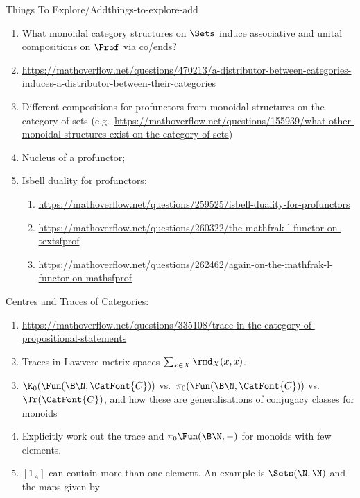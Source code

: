 \begin{remark}{Things To Explore/Add}{things-to-explore-add}
\begin{enumerate}
            However, if $\CatFont{V}$ is $*$-autonomous, then $\mathsf{Prof}_{\CatFont{V}}$ is a linear bicategory (Proposition 6.6 of \url{https://arxiv.org/abs/2209.05693}). In that case, there's probably a calculus of left/right Kan extensions/lifts one can develop. What is it?
        \item What monoidal category structures on $\Sets$ induce associative and unital compositions on $\Prof$ via co/ends?
        \item \url{https://mathoverflow.net/questions/470213/a-distributor-between-categories-induces-a-distributor-between-their-categories}
        \item Different compositions for profunctors from monoidal structures on the category of sets (e.g.\ \url{https://mathoverflow.net/questions/155939/what-other-monoidal-structures-exist-on-the-category-of-sets})
        \item Nucleus of a profunctor;
        \item Isbell duality for profunctors:
            \begin{enumerate}
                \item \url{https://mathoverflow.net/questions/259525/isbell-duality-for-profunctors}
                \item \url{https://mathoverflow.net/questions/260322/the-mathfrak-l-functor-on-textsfprof}
                \item \url{https://mathoverflow.net/questions/262462/again-on-the-mathfrak-l-functor-on-mathsfprof}
            \end{enumerate}
    \end{enumerate}
    Centres and Traces of Categories:
    \begin{enumerate}
        \item \url{https://mathoverflow.net/questions/335108/trace-in-the-category-of-propositional-statements}
        \item Traces in Lawvere metrix spaces $\sum_{x\in X}\rmd_{X}(x,x)$.
        \item $\K_{0}(\Fun(\B\N,\CatFont{C}))$ vs.\ $\pi_{0}(\Fun(\B\N,\CatFont{C}))$ vs.\ $\Tr(\CatFont{C})$, and how these are generalisations of conjugacy classes for monoids
        \item Explicitly work out the trace and $\pi_{0}\Fun(\B\N,-)$ for monoids with few elements.
        \item $[1_{A}]$ can contain more than one element. An example is $\Sets(\N,\N)$ and the maps given by
            \begin{align*}

\end{align*}
\end{enumerate}
\end{remark}
